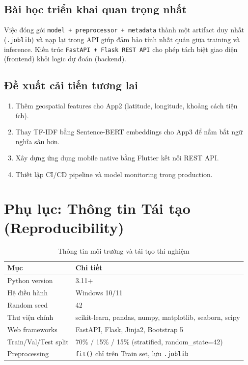 \documentclass[12pt, a4paper]{article}
\begin{document}
\subsection{Bài học triển khai quan trọng nhất}

Việc đóng gói \texttt{model + preprocessor + metadata} thành một artifact duy nhất (\texttt{.joblib}) và nạp lại trong API giúp đảm bảo tính nhất quán giữa training và inference. Kiến trúc \texttt{FastAPI + Flask REST API} cho phép tách biệt giao diện (frontend) khỏi logic dự đoán (backend).

\subsection{Đề xuất cải tiến tương lai}

\begin{enumerate}
    \item Thêm geospatial features cho App2 (latitude, longitude, khoảng cách tiện ích).
    \item Thay TF-IDF bằng Sentence-BERT embeddings cho App3 để nắm bắt ngữ nghĩa sâu hơn.
    \item Xây dựng ứng dụng mobile native bằng Flutter kết nối REST API.
    \item Thiết lập CI/CD pipeline và model monitoring trong production.
\end{enumerate}

\newpage
\section*{Phụ lục: Thông tin Tái tạo (Reproducibility)}

\begin{table}[H]
\centering
\caption{Thông tin môi trường và tái tạo thí nghiệm}
\label{tab:reproducibility}
\small
\begin{tabularx}{\textwidth}{|l|X|}
\hline
\textbf{Mục} & \textbf{Chi tiết} \\
\hline
Python version & 3.11+ \\
\hline
Hệ điều hành & Windows 10/11 \\
\hline
Random seed & 42 \\
\hline
Thư viện chính & scikit-learn, pandas, numpy, matplotlib, seaborn, scipy \\
\hline
Web frameworks & FastAPI, Flask, Jinja2, Bootstrap 5 \\
\hline
Train/Val/Test split & 70\% / 15\% / 15\% (stratified, random\_state=42) \\
\hline
Preprocessing & \texttt{fit()} chỉ trên Train set, lưu \texttt{.joblib} \\
\hline
\end{tabularx}
\end{table}
\end{document}
